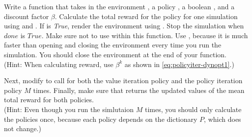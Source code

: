 \begin{problem}
\label{prob:policyiter-value6}
Write a function  that takes in the environment , a policy , a boolean , and a discount factor $\beta$.
Calculate the total reward for the policy for one simulation using  and .
If  is \emph{True}, render the environment using .
Stop the simulation when $done$ is $True$.
Make sure not to use  within this function.
Use , because it is much faster than opening and closing the environment every time you run the simulation.
You should close the environment at the end of your  function.
\\(Hint: When calculating reward, use $\beta^k$ as shown in \ref{eq:policyiter-dynopt1}.)

Next, modify  to call  for both the value iteration policy and the policy iteration policy $M$ times.
Finally, make sure that  returns the updated values of the mean total reward for both policies.
\\(Hint: Even though you run the simlutaion $M$ times, you should only calculate the policies once, because each policy depends on the dictionary $P$, which does not change.)
\end{problem}


